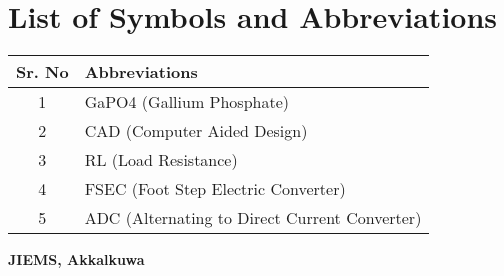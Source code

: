 \documentclass[12pt]{article}
\begin{document}
\vspace{1cm}

\section*{List of Symbols and Abbreviations}
\begin{table}[h!]
\centering
\begin{tabular}{|c|p{10cm}|}
\hline
\textbf{Sr. No} & \textbf{Abbreviations} \\ \hline
1 & GaPO4 (Gallium Phosphate) \\ \hline
2 & CAD (Computer Aided Design) \\ \hline
3 & RL (Load Resistance) \\ \hline
4 & FSEC (Foot Step Electric Converter) \\ \hline
5 & ADC (Alternating to Direct Current Converter) \\ \hline
\end{tabular}
\end{table}

\vspace{1cm}

\begin{flushright}
    \textbf{JIEMS, Akkalkuwa}
\end{flushright}


\newpage



\newpage 
\end{document}
